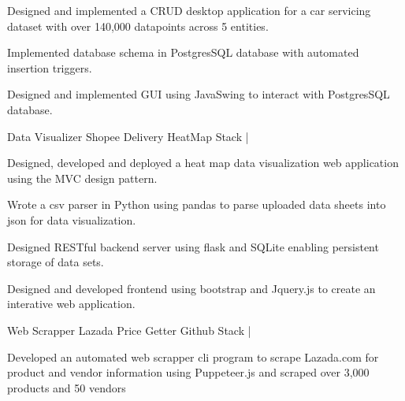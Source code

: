 \begin{cventries}
{\begin{cvitems}
        \item{Designed and implemented a CRUD desktop application for a car servicing dataset with over 140,000 datapoints across 5 entities. }
        \item{Implemented database schema in PostgresSQL database with automated insertion triggers. }
        \item{Designed and implemented GUI using JavaSwing to interact with PostgresSQL database. }
        \end{cvitems}
    }
    \cventry
    {Data Visualizer} %
    {Shopee Delivery HeatMap} %
    {\href{https://github.com/giathuan123/HeatMap}{\faGithubSquare}} %
    {Stack | \diExpressOriginal \diNodejsPlain \diBootstrapPlain \diJqueryPlain \diPythonPlain } %
    {
        \begin{cvitems} %
          \item{Designed, developed and deployed a heat map data visualization web application using the MVC design pattern. }
          \item{Wrote a csv parser in Python using pandas to parse uploaded data sheets into json for data visualization. }
          \item{Designed RESTful backend server using flask and SQLite enabling persistent storage of data sets. }
          \item{Designed and developed frontend using bootstrap and Jquery.js to create an interative web application. }
        \end{cvitems}
    }
    \cventry
    {Web Scrapper} %
    {Lazada Price Getter} %
    {Github} %
    {Stack | \diNodejsPlain } %
    {
        \begin{cvitems} %
        \item{Developed an automated web scrapper cli program to scrape Lazada.com for product and vendor information using Puppeteer.js and scraped over 3,000 products and 50 vendors }
        \end{cvitems}
    }
\end{cventries}
